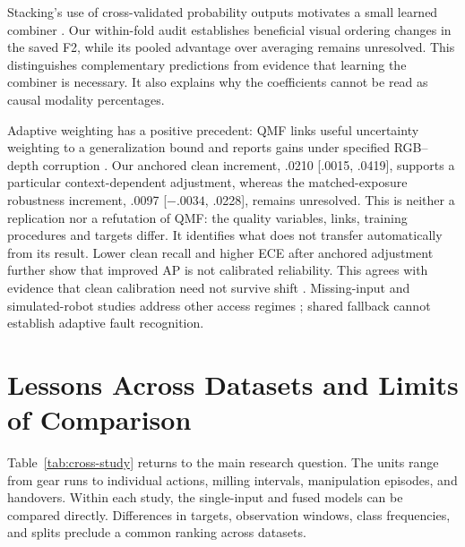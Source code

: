 Stacking's use of cross-validated probability outputs motivates a small learned combiner \citep{Ting1999Issues}. Our within-fold audit establishes beneficial visual ordering changes in the saved F2, while its pooled advantage over averaging remains unresolved. This distinguishes complementary predictions from evidence that learning the combiner is necessary. It also explains why the coefficients cannot be read as causal modality percentages.

Adaptive weighting has a positive precedent: QMF links useful uncertainty weighting to a generalization bound and reports gains under specified RGB--depth corruption \citep{Zhang2023QMF}. Our anchored clean increment, .0210 [.0015, .0419], supports a particular context-dependent adjustment, whereas the matched-exposure robustness increment, .0097 [$-.0034$, .0228], remains unresolved. This is neither a replication nor a refutation of QMF: the quality variables, links, training procedures and targets differ. It identifies what does not transfer automatically from its result. Lower clean recall and higher ECE after anchored adjustment further show that improved AP is not calibrated reliability. This agrees with evidence that clean calibration need not survive shift \citep{P008}. Missing-input and simulated-robot studies address other access regimes \citep{P026,Altinses2023Fuzzy}; shared fallback cannot establish adaptive fault recognition.

\section{Lessons Across Datasets and Limits of Comparison}
Table~\ref{tab:cross-study} returns to the main research question. The units range from gear runs to individual actions, milling intervals, manipulation episodes, and handovers. Within each study, the single-input and fused models can be compared directly. Differences in targets, observation windows, class frequencies, and splits preclude a common ranking across datasets.

